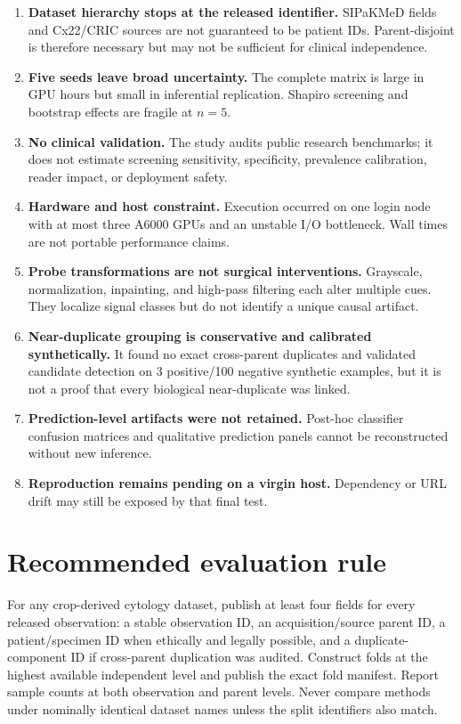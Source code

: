 \begin{enumerate}[leftmargin=2em]
  \item \textbf{Dataset hierarchy stops at the released identifier.} SIPaKMeD fields and Cx22/CRIC sources are not guaranteed to be patient IDs. Parent-disjoint is therefore necessary but may not be sufficient for clinical independence.
  \item \textbf{Five seeds leave broad uncertainty.} The complete matrix is large in GPU hours but small in inferential replication. Shapiro screening and bootstrap effects are fragile at $n=5$.
  \item \textbf{No clinical validation.} The study audits public research benchmarks; it does not estimate screening sensitivity, specificity, prevalence calibration, reader impact, or deployment safety.
  \item \textbf{Hardware and host constraint.} Execution occurred on one login node with at most three A6000 GPUs and an unstable I/O bottleneck. Wall times are not portable performance claims.
  \item \textbf{Probe transformations are not surgical interventions.} Grayscale, normalization, inpainting, and high-pass filtering each alter multiple cues. They localize signal classes but do not identify a unique causal artifact.
  \item \textbf{Near-duplicate grouping is conservative and calibrated synthetically.} It found no exact cross-parent duplicates and validated candidate detection on 3 positive/100 negative synthetic examples, but it is not a proof that every biological near-duplicate was linked.
  \item \textbf{Prediction-level artifacts were not retained.} Post-hoc classifier confusion matrices and qualitative prediction panels cannot be reconstructed without new inference.
  \item \textbf{Reproduction remains pending on a virgin host.} Dependency or URL drift may still be exposed by that final test.
\end{enumerate}

\section{Recommended evaluation rule}

For any crop-derived cytology dataset, publish at least four fields for every released observation: a stable observation ID, an acquisition/source parent ID, a patient/specimen ID when ethically and legally possible, and a duplicate-component ID if cross-parent duplication was audited. Construct folds at the highest available independent level and publish the exact fold manifest. Report sample counts at both observation and parent levels. Never compare methods under nominally identical dataset names unless the split identifiers also match.


